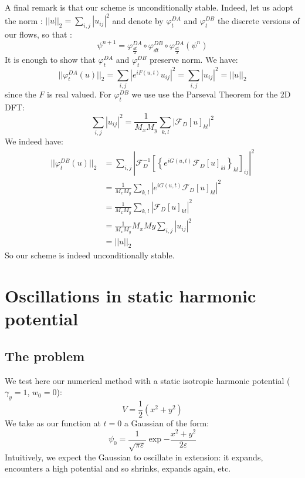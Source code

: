 \documentclass{article}
\begin{document}
A final remark is that our scheme is unconditionally stable. Indeed, let us adopt the norm : $||u||_2=\sum_{i,j}|u_{ij}|^2$ and denote by $\varphi^{DA}_t$ and $\varphi^{DB}_t$ the discrete versions of our flows, so that :
$$\psi^{n+1}=\varphi^{DA}_\frac{dt}{2}\circ\varphi^{DB}_{dt}\circ\varphi^{DA}_\frac{dt}{2}(\psi^n)$$
It is enough to show that $\varphi^{DA}_t$ and $\varphi^{DB}_t$ preserve norm. We have:
$$||\varphi^{DA}_t(u)||_2=\sum_{i,j}|e^{iF(u,t)}u_{ij}|^2=\sum_{i,j}|u_{ij}|^2=||u||_2$$
since the $F$ is real valued. For $\varphi^{DB}_t$ we use use the Parseval Theorem for the 2D DFT:
$$\sum_{i,j}|u_{ij}|^2=\frac{1}{M_x M_y}\sum_{k,l}\Bigr|\mathcal{F}_D[u]_{kl}\Bigr|^2$$
We indeed have:
\begin{equation*}
\begin{split}
   ||\varphi^{DB}_t(u)||_2&=\sum_{i,j}\left|\mathcal{F}_D^{-1}\left[\left\{e^{i G(u,t)}\mathcal{F}_D\left[u\right]_{kl}\right\}_{kl}\right]_{ij}\right|^2\\
   &=\frac{1}{M_x M_y}\sum_{k,l}\left|e^{i G(u,t)}\mathcal{F}_D\left[u\right]_{kl}\right|^2\\
   &=\frac{1}{M_x M_y}\sum_{k,l}\left|\mathcal{F}_D\left[u\right]_{kl}\right|^2\\
   &=\frac{1}{M_x M_y}M_x My\sum_{i,j}\left|u_{ij}\right|^2
   \\
   &=||u||_2
\end{split}
\end{equation*}
So our scheme is indeed unconditionally stable.


\section{Oscillations in static harmonic potential}\label{sec:Static}

\subsection{The problem}
We test here our numerical method with a static isotropic harmonic potential ($\gamma_y=1$, $w_0=0$):
$$V=\frac{1}{2}\left(x^2+y^2\right)$$
We take as our function at $t=0$ a Gaussian of the form:
$$\psi_0=\frac{1}{\sqrt{\pi\varepsilon}}\exp{-\frac{x^2+y^2}{2\varepsilon}}$$
Intuitively, we expect the Gaussian to oscillate in extension: it expands, encounters a high potential and so shrinks, expands again, etc.
\end{document}
